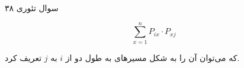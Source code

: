 سوال تئوری ۳۸

$$ \sum_{x=1}^{n} P_{ix}\cdot P_{xj}$$

که می‌توان آن را به شکل مسیرهای به طول دو از $i$ به $j$ تعریف کرد.